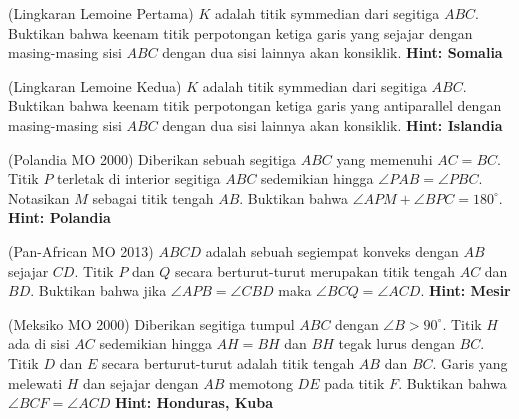\documentclass[11pt]{scrartcl}
\begin{document}
\begin{problem}
    (Lingkaran Lemoine Pertama) $K$ adalah titik symmedian dari segitiga $ABC$. Buktikan bahwa keenam titik perpotongan ketiga garis yang sejajar dengan masing-masing sisi $ABC$ dengan dua sisi lainnya akan konsiklik. \textbf{Hint: Somalia}
\end{problem}

\begin{problem}
    (Lingkaran Lemoine Kedua) $K$ adalah titik symmedian dari segitiga $ABC$. Buktikan bahwa keenam titik perpotongan ketiga garis yang antiparallel dengan masing-masing sisi $ABC$ dengan dua sisi lainnya akan konsiklik. \textbf{Hint: Islandia}
\end{problem}

\begin{problem}
    (Polandia MO 2000) Diberikan sebuah segitiga $ABC$ yang memenuhi $AC = BC$. Titik $P$ terletak di interior segitiga $ABC$ sedemikian hingga $\angle{PAB} = \angle{PBC}$. Notasikan $M$ sebagai titik tengah $AB$. Buktikan bahwa $\angle{APM} + \angle{BPC} = 180^{\circ}$. \textbf{Hint: Polandia}
\end{problem}

\begin{problem}
    (Pan-African MO 2013) $ABCD$ adalah sebuah segiempat konveks dengan $AB$ sejajar $CD$. Titik $P$ dan $Q$ secara berturut-turut merupakan titik tengah $AC$ dan $BD$. Buktikan bahwa jika $\angle{APB} = \angle{CBD}$ maka $\angle{BCQ} = \angle{ACD}$.
    \textbf{Hint: Mesir}
\end{problem}

\begin{problem}
    (Meksiko MO 2000) Diberikan segitiga tumpul $ABC$ dengan $\angle B > 90^{\circ}$. Titik $H$ ada di sisi $AC$ sedemikian hingga $AH = BH$ dan $BH$ tegak lurus dengan $BC$. Titik $D$ dan $E$ secara berturut-turut adalah titik tengah $AB$ dan $BC$. Garis yang melewati $H$ dan sejajar dengan $AB$ memotong $DE$ pada titik $F$. Buktikan bahwa $\angle{BCF} = \angle{ACD}$
    \textbf{Hint: Honduras, Kuba}
\end{problem}

\newpage
\end{document}
